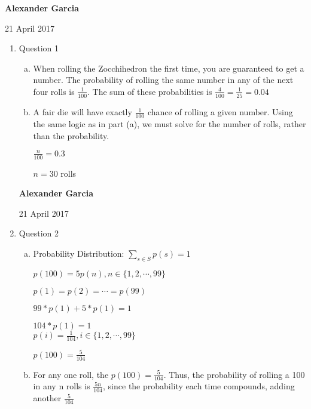 \documentclass[11pt]{article}
\begin{document}
\textbf{Alexander Garcia}

21 April 2017 \\

	\begin{enumerate}

		\item Question 1

			\begin{enumerate}[(a)]

				\item When rolling the Zocchihedron the first time, you are guaranteed to get a number.
					The probability of rolling the same number in any of the next four rolls is
					$\frac{1}{100}$. The sum of these probabilities is $\frac{4}{100} = \frac{1}{25} = 0.04$\\

				\item A fair die will have exactly $\frac{1}{100}$ chance of rolling a given number.
					Using the same logic as in part (a), we must solve for the number of rolls, rather
					than the probability.

					$\frac{n}{100} = 0.3$

					$n = 30$ rolls \\


			\end{enumerate}

\newpage

\textbf{Alexander Garcia}

21 April 2017 \\

		\item Question 2

			\begin{enumerate}[(a)]

				\item Probability Distribution: $\sum_{s \in S}{p(s)} = 1$

					$p(100) = 5p(n), n \in \{1, 2, \cdots, 99\}$

					$p(1) = p(2) = \cdots = p(99)$

					$99*p(1) + 5*p(1) = 1$

					$104*p(1) = 1$ \\

					$p(i) = \frac{1}{104}, i \in \{1, 2, \cdots, 99\}$

					$p(100) = \frac{5}{104}$ \\

				\item For any one roll, the $p(100) = \frac{5}{104}$. Thus, the
					probability of rolling a 100 in any n rolls is $\frac{5n}{104}$, since
					the probability each time compounds, adding another $\frac{5}{104}$


\end{enumerate}
\end{enumerate}
\end{document}
